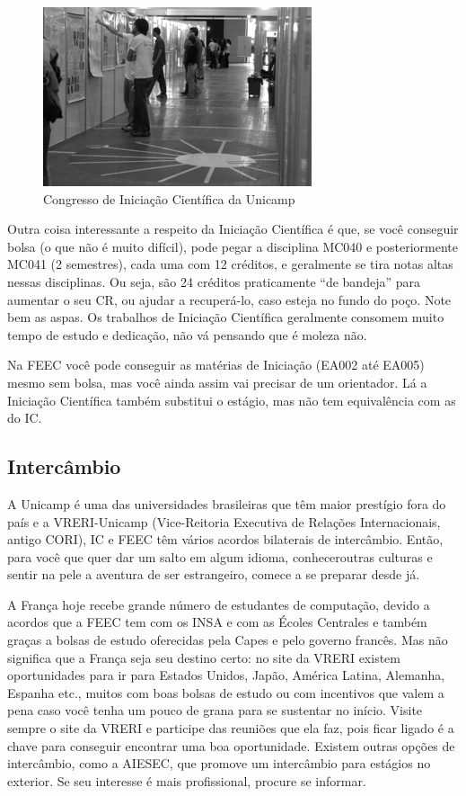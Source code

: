\begin{figure}[h!]
    \centering
    \includegraphics[width=.45\textwidth]{img/unicamp/congresso.jpg}
    \caption*{Congresso de Iniciação Científica da Unicamp}
\end{figure}

Outra coisa interessante a respeito da Iniciação Científica é que, se você
conseguir bolsa (o que não é muito difícil), pode pegar a disciplina MC040 e
posteriormente MC041 (2 semestres), cada uma com 12 créditos, e geralmente se
tira notas altas nessas disciplinas. Ou seja, são 24 créditos praticamente ``de
bandeja'' para aumentar o seu CR, ou ajudar a recuperá-lo, caso esteja no fundo
do poço. Note bem as aspas. Os trabalhos de Iniciação Científica geralmente
consomem muito tempo de estudo e dedicação, não vá pensando que é moleza não.

Na FEEC você pode conseguir as matérias de Iniciação (EA002 até EA005) mesmo sem
bolsa, mas você ainda assim vai precisar de um orientador. Lá a Iniciação
Científica também substitui o estágio, mas não tem equivalência com as do IC.

\subsection{Intercâmbio}

A Unicamp é uma das universidades brasileiras que têm maior prestígio fora do
país e a VRERI-Unicamp (Vice-Reitoria Executiva de Relações Internacionais,
antigo CORI), IC e FEEC têm vários acordos bilaterais de intercâmbio. Então,
para você que quer dar um salto em algum idioma, conheceroutras culturas e
sentir na pele a aventura de ser estrangeiro, comece a se preparar desde já.

A França hoje recebe grande número de estudantes de computação, devido a acordos
que a FEEC tem com os INSA e com as Écoles Centrales e também graças a bolsas de
estudo oferecidas pela Capes e pelo governo francês. Mas não significa que a
França seja seu destino certo: no site da VRERI existem oportunidades para ir
para Estados Unidos, Japão, América Latina, Alemanha, Espanha etc., muitos com
boas bolsas de estudo ou com incentivos que valem a pena caso você tenha um
pouco de grana para se sustentar no início. Visite sempre o site da VRERI e
participe das reuniões que ela faz, pois ficar ligado é a chave para conseguir
encontrar uma boa oportunidade. Existem outras opções de intercâmbio, como a
AIESEC, que promove um intercâmbio para estágios no exterior. Se seu interesse é
mais profissional, procure se informar.

